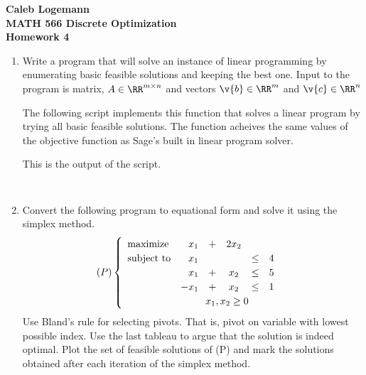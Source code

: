 \documentclass[11pt, oneside]{article}
\begin{document}
\noindent \textbf{\Large{Caleb Logemann \\
MATH 566 Discrete Optimization\\
Homework 4
}}

%
\begin{enumerate}
  \item %
    Write a program that will solve an instance of linear programming by
    enumerating basic feasible solutions and keeping the best one.
    Input to the program is matrix, $A \in \RR^{m \times n}$ and vectors
    $\v{b} \in \RR^m$ and $\v{c} \in \RR^n$

    The following script implements this function that solves a linear
    program by trying all basic feasible solutions.
    The function acheives the same values of the objective function as Sage's
    built in linear program solver.
    
    This is the output of the script.
    \begin{verbatim}
        
    \end{verbatim}

  \item %
    Convert the following program to equational form and solve it using the
    simplex method.
    \[
      (P) 
      \begin{cases} 
        \begin{array}{lrccccc} 
          \text{maximize}    &x_1  &+  &2x_2 &     &   \\
          \text{subject to}  &x_1  &   &     &\leq & 4 \\
                             &x_1  &+  &x_2  &\leq & 5 \\
                             &-x_1 &+  &x_2  &\leq & 1 \\
        \end{array}\\
        \text{ \hskip 8em } x_1,x_2 \geq 0
      \end{cases}
    \]
    Use Bland's rule for selecting pivots.
    That is, pivot on variable with lowest possible index.
    Use the last tableau to argue that the solution is indeed optimal.
    Plot the set of feasible solutions of (P) and mark the solutions obtained
    after each iteration of the simplex method.


\end{enumerate}
\end{document}
